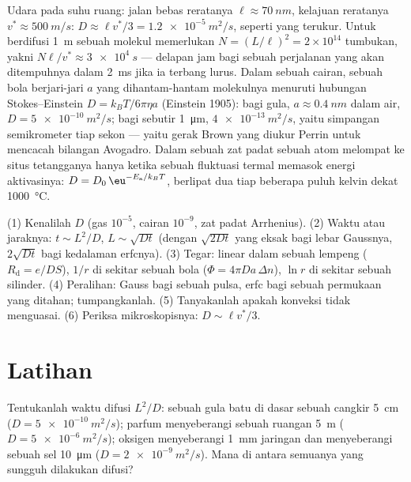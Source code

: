 \begin{example}\label{ex:b2:particle-diffusion:kinetic}
Udara pada suhu ruang: jalan bebas reratanya $\ell \approx \qty{70}{nm}$,
kelajuan reratanya $v^* \approx \qty{500}{m/s}$: $D \approx \ell v^*/3 =
\qty{1.2e-5}{m^2/s}$, seperti yang terukur. Untuk berdifusi \qty{1}{m} sebuah molekul
memerlukan $N = (L/\ell)^2 = 2 \times 10^{14}$ tumbukan, yakni $N\ell/v^*
\approx \qty{3e4}{s}$ --- delapan jam bagi sebuah perjalanan yang akan ditempuhnya dalam
\qty{2}{ms} jika ia terbang lurus. Dalam sebuah cairan, sebuah bola berjari-jari $a$
yang dihantam-hantam molekulnya menuruti hubungan Stokes--Einstein $D =
k_BT/6\pi\eta a$ (Einstein 1905): bagi gula, $a \approx \qty{0.4}{nm}$
dalam air, $D = \qty{5e-10}{m^2/s}$; bagi sebutir \qty{1}{\micro m},
$\qty{4e-13}{m^2/s}$, yaitu simpangan semikrometer tiap sekon ---
yaitu gerak Brown yang diukur Perrin untuk mencacah bilangan Avogadro. Dalam
sebuah zat padat sebuah atom melompat ke situs tetangganya hanya ketika sebuah fluktuasi
termal memasok energi aktivasinya: $D = D_0\,\eu^{-E_{\text{a}}/k_BT}$,
berlipat dua tiap beberapa puluh kelvin dekat \qty{1000}{\celsius}.
\end{example}

\begin{method}\label{meth:b2:particle-diffusion:method}
(1) Kenalilah $D$ (gas $10^{-5}$, cairan $10^{-9}$, zat padat Arrhenius).
(2) Waktu atau jaraknya: $t \sim L^2/D$, $L \sim \sqrt{Dt}$ (dengan
$\sqrt{2Dt}$ yang eksak bagi lebar Gaussnya, $2\sqrt{Dt}$ bagi kedalaman erfcnya).
(3) Tegar: linear dalam sebuah lempeng ($R_{\text{d}} = e/DS$), $1/r$ di sekitar sebuah
bola ($\Phi = 4\pi D a\,\Delta n$), $\ln r$ di sekitar sebuah silinder. (4)
Peralihan: Gauss bagi sebuah pulsa, erfc bagi sebuah permukaan yang ditahan; tumpangkanlah.
(5) Tanyakanlah apakah konveksi tidak menguasai. (6) Periksa mikroskopisnya:
$D \sim \ell v^*/3$.
\end{method}

\section{Latihan}

\begin{exercise}[$\star$]\label{exo:b2:particle-diffusion:1}
Tentukanlah waktu difusi $L^2/D$: sebuah gula batu di dasar sebuah cangkir \qty{5}{cm}
($D = \qty{5e-10}{m^2/s}$); parfum menyeberangi sebuah ruangan \qty{5}{m} ($D =
\qty{5e-6}{m^2/s}$); oksigen menyeberangi \qty{1}{mm} jaringan dan menyeberangi sebuah
sel \qty{10}{\micro m} ($D = \qty{2e-9}{m^2/s}$). Mana di antara semuanya yang sungguh
dilakukan difusi?
\end{exercise}


